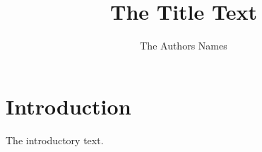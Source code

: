 \documentclass[epj]{svjour}
\title{The Title Text}
\author{The Authors Names}
\begin{document}
\maketitle
\section{Introduction}
The introductory text.
\end{document}
